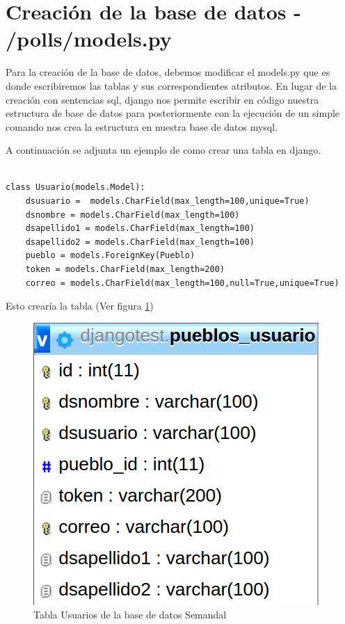 \section{Creación de la base de datos - /polls/models.py\label{Creacion_tablas}}
	Para la creación de la base de datos, debemos modificar el models.py que es donde escribiremos las tablas y sus correspondientes atributos. 
	En lugar de la creación con sentencias sql, django nos permite escribir en código nuestra estructura de base de datos para posteriormente con la ejecución de un simple comando nos crea la estructura en nuestra base de datos mysql.
	
	A continuación se adjunta un ejemplo de como crear una tabla en django.
	
\begin{lstlisting}

class Usuario(models.Model):
	dsusuario =  models.CharField(max_length=100,unique=True)
	dsnombre = models.CharField(max_length=100)
	dsapellido1 = models.CharField(max_length=100)
	dsapellido2 = models.CharField(max_length=100)
	pueblo = models.ForeignKey(Pueblo)
	token = models.CharField(max_length=200)
	correo = models.CharField(max_length=100,null=True,unique=True)

\end{lstlisting}

Esto crearía la tabla (Ver figura \ref{tablausuario})


\begin{figure}
\centering
\includegraphics[scale=0.25]{./django/imagenes/tabla.png}
\caption{Tabla Usuarios de la base de datos Semandal}
\label{tablausuario}
\end{figure}

